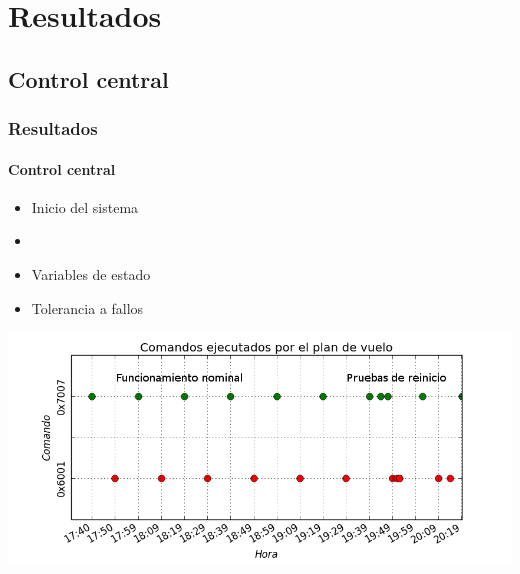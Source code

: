 \documentclass[xcolor=dvipsnames]{beamer}
\begin{document}
    \section{Resultados}
    \subsection{Control central}
    \begin{frame}[allowframebreaks]
        \frametitle{Resultados}
        \framesubtitle{Control central}
        
%         
        
        
        \begin{itemize}
            \item Inicio del sistema
            \item {}
            \item Variables de estado
            \item Tolerancia a fallos
        \end{itemize}
        
        \begin{center}
            \includegraphics[height=0.6\textheight]{img/plot_fplan.png}
        \end{center}
        

\end{frame}
\end{document}
